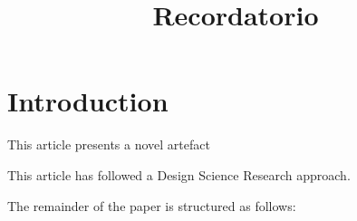 \documentclass{article}
\title{Recordatorio}
\author{}
\begin{document}
\maketitle
      

\section{Introduction}


    

    

    

    
This article presents a novel artefact
    

    

      
This article has followed a Design Science Research approach.

The remainder of the paper is structured as follows: 

    
      


\end{document}

